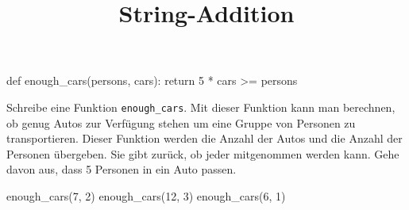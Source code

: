 \documentclass[a4paper, fontsize = 13, DIV = calc]{scrartcl}
\title{String-Addition}
\date{}
\newcommand{\expandpyconc}[1]{\expandafter\reallyexpandpyconc\expandafter{#1}}
\newcommand{\reallyexpandpyconc}[1]{\pyconc{exec(compile(open('#1', 'rb').read(), '#1', 'exec'))}}
\newenvironment{pyconcodeblck}[1]
{\newcommand{\snippetfile}{snippet-#1.py}
	\VerbatimEnvironment
	\begin{VerbatimOut}{\snippetfile}}
	{\end{VerbatimOut}
	\expandpyconc{\snippetfile}}
\begin{document}
\begin{pyconcodeblck}{temp}
def enough_cars(persons, cars):
	return 5 * cars >= persons
\end{pyconcodeblck}





\begin{aufgabe} \noindent 
Schreibe eine Funktion \texttt{enough_cars}. Mit dieser Funktion kann man berechnen, ob genug Autos zur Verfügung stehen um eine Gruppe von Personen zu transportieren. Dieser Funktion werden die Anzahl der Autos und die Anzahl der Personen übergeben. Sie gibt zurück, ob jeder mitgenommen werden kann. Gehe davon aus, dass 5 Personen in ein Auto passen.
\begin{pyconsole}
enough_cars(7, 2)
enough_cars(12, 3)
enough_cars(6, 1)
\end{pyconsole}
\end{aufgabe}



\newpage
\end{document}
